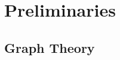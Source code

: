\chapter{Preliminaries}
\label{ch:Preliminaries}

\section{Graph Theory}
\label{sec:Preliminaries:GraphTheory}
